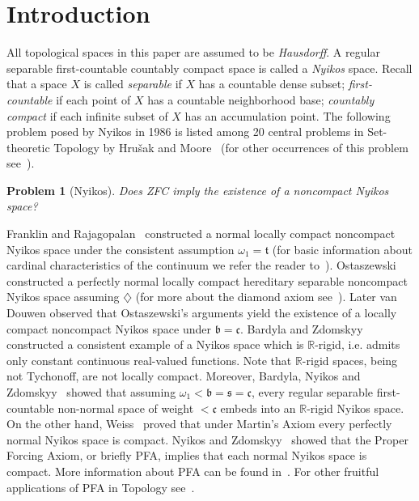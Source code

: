 \documentclass[12pt, twoside, leqno]{article}
\newtheorem{problem}[theorem]{Problem}
\theoremstyle{definition}
\numberwithin{equation}{section}
\newcommand{\R}{\mathbb R}
\newcommand{\w}{\omega}
\begin{document}
\section{Introduction}
All topological spaces in this paper are assumed to be {\em Hausdorff}. A regular separable first-countable countably compact space is called a {\em Nyikos} space.
Recall that a space $X$ is called {\em separable} if $X$ has a  countable dense subset; 
{\em first-countable} if each point of $X$ has a countable neighborhood base; {\em countably compact} if each infinite subset of $X$ has an accumulation point.
The following problem posed by Nyikos in 1986 is listed among 20 central problems in Set-theoretic Topology by Hru\v{s}ak and Moore~\cite{HM} (for other occurrences of this problem see~\cite{Ny1,Ny2,Prob}).      



\begin{problem}[Nyikos]\label{pN}
Does ZFC imply the existence of a noncompact Nyikos space?
\end{problem}

Franklin and Rajagopalan~\cite{FR} constructed a normal locally compact noncompact Nyikos space under the consistent assumption $\w_1=\mathfrak t$ (for basic information about cardinal characteristics of the continuum we refer the reader to~\cite{Blass}). Ostaszewski~\cite{Ost} constructed a perfectly normal locally compact hereditary separable noncompact Nyikos space assuming $\diamondsuit$ (for more about the diamond axiom see~\cite[Chapter II.7]{Kun}). Later van Douwen observed that Ostaszewski's arguments yield the existence of a locally compact noncompact Nyikos space under $\mathfrak b=\mathfrak c$. Bardyla and Zdomskyy~\cite{BZ} constructed a consistent example of a Nyikos space which is $\R$-rigid, i.e. admits only constant continuous real-valued functions. Note that $\R$-rigid spaces, being not Tychonoff, are not locally compact. Moreover, Bardyla, Nyikos and Zdomskyy~\cite{BNZ} showed that assuming $\w_1<\mathfrak b=\mathfrak s=\mathfrak c$, every regular separable first-countable non-normal space of weight $<\mathfrak c$ embeds into an $\R$-rigid
Nyikos space.  On the other hand, Weiss~\cite{Weiss} proved that under Martin's Axiom every perfectly normal Nyikos space is compact. Nyikos and Zdomskyy~\cite{NZ} showed that the Proper Forcing Axiom, or briefly PFA, implies that each normal Nyikos space is compact. More information about PFA can be found in~\cite{Moore,Viale}. For other fruitful applications of PFA in Topology see~\cite{PFA2,PFA3,PFA}.
\end{document}
